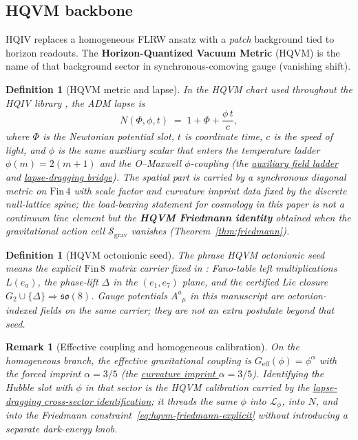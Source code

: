 \documentclass[11pt]{amsart}
\newtheorem{definition}[theorem]{Definition}
\newtheorem{remark}[theorem]{Remark}
\begin{document}
\subsection{HQVM backbone}
\label{subsec:hqvm}

HQIV replaces a homogeneous FLRW ansatz with a \emph{patch} background tied to horizon readouts.
The \textbf{Horizon-Quantized Vacuum Metric} (HQVM) is the name of that background sector in synchronous-comoving gauge (vanishing shift).

\begin{definition}[HQVM metric and lapse]
\label{def:hqvm}
In the HQVM chart used throughout the HQIV library \cite{ettinger2026hqiv,hqiv-lean}, the ADM lapse is
\[
  N(\Phi,\phi,t) \;=\; 1 + \Phi + \frac{\phi\,t}{c},
\]
where \(\Phi\) is the Newtonian potential slot, \(t\) is coordinate time, \(c\) is the speed of light, and \(\phi\) is the \emph{same} auxiliary scalar that enters the temperature ladder \(\phi(m)=2(m+1)\) and the O--Maxwell \(\phi\)-coupling (the \hyperref[lean:phi-ladder]{auxiliary field ladder} and \hyperref[lean:lapse-bridge]{lapse-dragging bridge}).
The spatial part is carried by a synchronous diagonal metric on \(\mathrm{Fin}\,4\) with scale factor and curvature imprint data fixed by the discrete null-lattice spine; the load-bearing statement for cosmology in this paper is not a continuum line element but the \textbf{HQVM Friedmann identity} obtained when the gravitational action cell \(\mathcal{S}_{\mathrm{grav}}\) vanishes (Theorem~\ref{thm:friedmann}).
\end{definition}

\begin{definition}[HQVM octonionic seed]
\label{def:hqvm-seed}
The phrase \emph{HQVM octonionic seed} means the explicit \(\mathrm{Fin}\,8\) matrix carrier fixed in \cite{hqiv-so8-paper}: Fano-table left multiplications \(L(e_a)\), the phase-lift \(\Delta\) in the \((e_1,e_7)\) plane, and the certified Lie closure \(G_2\cup\{\Delta\}\Rightarrow\mathfrak{so}(8)\).
Gauge potentials \(A^a{}_\mu\) in this manuscript are octonion-indexed fields on the same carrier; they are not an extra postulate beyond that seed.
\end{definition}

\begin{remark}[Effective coupling and homogeneous calibration]
\label{rem:hqvm-coupling}
On the homogeneous branch, the effective gravitational coupling is \(G_{\mathrm{eff}}(\phi)=\phi^{\alpha}\) with the forced imprint \(\alpha=3/5\) (the \hyperref[lean:imprint-alpha]{curvature imprint \(\alpha=3/5\)}).
Identifying the Hubble slot with \(\phi\) in that sector is the HQVM calibration carried by the \hyperref[lean:lapse-bridge]{lapse-dragging cross-sector identification}; it threads the same \(\phi\) into \(\mathcal{L}_\phi\), into \(N\), and into the Friedmann constraint~\eqref{eq:hqvm-friedmann-explicit} without introducing a separate dark-energy knob.
\end{remark}
\end{document}

